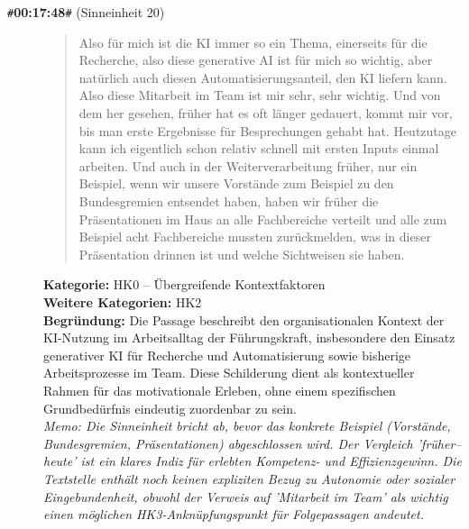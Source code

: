 \begin{description}
  \item[\texttt{\#}\textbf{00:17:48}\texttt{\#} (Sinneinheit 20)]
  \begin{quote}
  Also für mich ist die KI immer so ein Thema, einerseits für die Recherche, also diese generative AI ist für mich so wichtig, aber natürlich auch diesen Automatisierungsanteil, den KI liefern kann. Also diese Mitarbeit im Team ist mir sehr, sehr wichtig. Und von dem her gesehen, früher hat es oft länger gedauert, kommt mir vor, bis man erste Ergebnisse für Besprechungen gehabt hat. Heutzutage kann ich eigentlich schon relativ schnell mit ersten Inputs einmal arbeiten. Und auch in der Weiterverarbeitung früher, nur ein Beispiel, wenn wir unsere Vorstände zum Beispiel zu den Bundesgremien entsendet haben, haben wir früher die Präsentationen im Haus an alle Fachbereiche verteilt und alle zum Beispiel acht Fachbereiche mussten zurückmelden, was in dieser Präsentation drinnen ist und welche Sichtweisen sie haben.
  \end{quote}
  \textbf{Kategorie:} HK0 -- Übergreifende Kontextfaktoren\\
  \textbf{Weitere Kategorien:} HK2\\
  \textbf{Begr\"undung:} Die Passage beschreibt den organisationalen Kontext der KI-Nutzung im Arbeitsalltag der Führungskraft, insbesondere den Einsatz generativer KI für Recherche und Automatisierung sowie bisherige Arbeitsprozesse im Team. Diese Schilderung dient als kontextueller Rahmen für das motivationale Erleben, ohne einem spezifischen Grundbedürfnis eindeutig zuordenbar zu sein.
  \\\textit{Memo: Die Sinneinheit bricht ab, bevor das konkrete Beispiel (Vorstände, Bundesgremien, Präsentationen) abgeschlossen wird. Der Vergleich 'früher–heute' ist ein klares Indiz für erlebten Kompetenz- und Effizienzgewinn. Die Textstelle enthält noch keinen expliziten Bezug zu Autonomie oder sozialer Eingebundenheit, obwohl der Verweis auf 'Mitarbeit im Team' als wichtig einen möglichen HK3-Anknüpfungspunkt für Folgepassagen andeutet.}
\end{description}
\medskip

